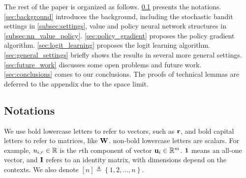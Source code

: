 



The rest of the paper is organized as follows. \cref{subsec:notations} presents the notations.   \cref{sec:background} introduces the background, including the stochastic bandit settings in  \cref{subsec:settings}, value and policy neural network structures in \cref{subsec:nn_value_policy}. \cref{sec:policy_gradient} proposes the policy gradient algorithm. \cref{sec:logit_learning} proposes the logit learning algorithm. \cref{sec:general_settings} briefly shows the results in several more general settings. \cref{sec:future_work} discusses some open problems and future work. \cref{sec:conclusions} comes to our conclusions. The proofs of technical lemmas are deferred to the appendix due to the space limit.

\subsection{Notations}
\label{subsec:notations}
We use bold lowercase letters to refer to vectors, such as ${\mathbf{r}}$, and bold capital letters to refer to matrices, like ${\mathbf{W}}$. non-bold lowercase letters are scalars. For example, $u_{i,r} \in {\mathbb{R}}$ is the $r$th component of vector ${\mathbf{u}}_i \in {\mathbb{R}}^m$. ${\mathbf{1}}$ means an all-one vector, and ${\mathbf{I}}$ refers to an identity matrix, with dimensions depend on the contexts. We also denote $[n] \triangleq \left\{ 1,2, \dots, n \right\}$. 

